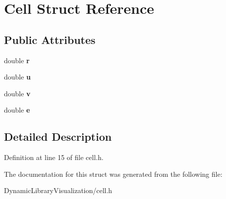 \hypertarget{struct_cell}{}\section{Cell Struct Reference}
\label{struct_cell}
\subsection*{Public Attributes}
\begin{DoxyCompactItemize}
\item 
\mbox{\label{struct_cell_a68f185a01b006f1b516684a0ae03ff30}} 
double {\bfseries r}
\item 
\mbox{\label{struct_cell_a6faf2694b70c302ec13f8ffe3ceac7a4}} 
double {\bfseries u}
\item 
\mbox{\label{struct_cell_a90fed40bb4c82547816875b5c68d35fe}} 
double {\bfseries v}
\item 
\mbox{\label{struct_cell_ab4ad140f632058b7099188d0860fb236}} 
double {\bfseries e}
\end{DoxyCompactItemize}


\subsection{Detailed Description}


Definition at line 15 of file cell.\+h.



The documentation for this struct was generated from the following file\+:\begin{DoxyCompactItemize}
\item 
Dynamic\+Library\+Visualization/cell.\+h\end{DoxyCompactItemize}
